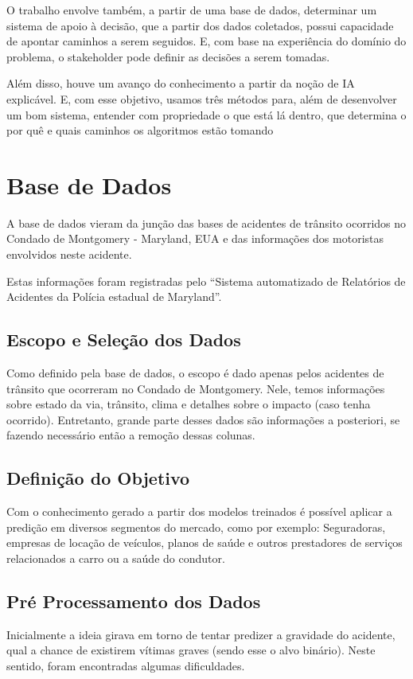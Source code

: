 \documentclass[conference]{IEEEtran}
\begin{document}
O trabalho envolve também, a partir de uma base de dados, determinar um sistema de apoio à decisão, que a partir dos dados coletados,
possui capacidade de apontar caminhos a serem seguidos. E, com base na experiência do domínio do problema, o stakeholder pode definir as decisões a serem tomadas.

Além disso, houve um avanço do conhecimento a partir da noção de IA explicável. E, com esse objetivo, usamos três métodos para, 
além de desenvolver um bom sistema, entender com propriedade o que está lá dentro, que determina o por quê e quais caminhos os algoritmos estão tomando


\section{Base de Dados}

A base de dados vieram da junção das bases de acidentes de trânsito\cite{incidents}
ocorridos no Condado de Montgomery - Maryland, EUA e das informações dos motoristas envolvidos neste acidente\cite{drivers}.

Estas informações foram registradas pelo “Sistema automatizado de Relatórios de Acidentes da Polícia estadual de Maryland”. 


\subsection{Escopo e Seleção dos Dados}
Como definido pela base de dados, o escopo é dado apenas pelos acidentes de trânsito que ocorreram no Condado de Montgomery. 
Nele, temos informações sobre estado da via, trânsito, clima e detalhes sobre o impacto (caso tenha ocorrido). 
Entretanto, grande parte desses dados são informações a posteriori, se fazendo necessário então a remoção dessas colunas.

\subsection{Definição do Objetivo}
Com o conhecimento gerado a partir dos modelos treinados é possível aplicar a predição em diversos segmentos do mercado, 
como por exemplo: Seguradoras, empresas de locação de veículos, planos de saúde e outros prestadores de serviços relacionados a carro ou a saúde do condutor.

\subsection{Pré Processamento dos Dados}
Inicialmente a ideia girava em torno de tentar predizer a gravidade do acidente, qual a chance de existirem vítimas graves (sendo esse o alvo binário). 
Neste sentido, foram encontradas algumas dificuldades. 
\end{document}
